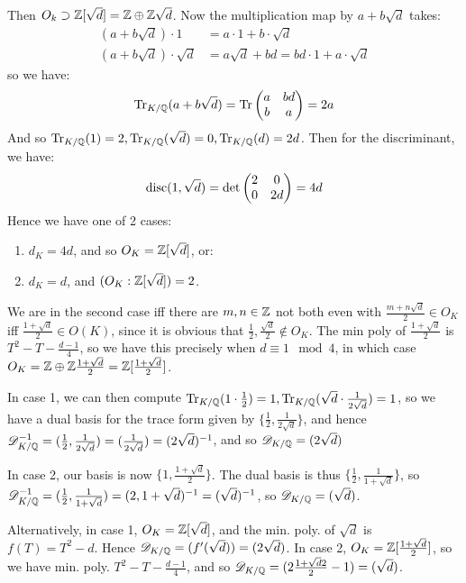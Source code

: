 \documentclass[10pt,a4paper]{article}
\begin{document}
Then $O_k \supset \mathbb{Z}[\sqrt{d}] = \mathbb{Z} \oplus \mathbb{Z}\sqrt{d}$. Now the multiplication map by $a+b\sqrt{d}$ takes:
\begin{align*}
  (a+b\sqrt{d})\cdot 1 &= a\cdot 1 + b\cdot \sqrt{d}\\
  (a+b\sqrt{d})\cdot \sqrt{d} &= a\sqrt{d} + bd = bd\cdot 1 + a\cdot \sqrt{d}
\end{align*}
so we have:
\[\operatorname{Tr}_{K/\mathbb{Q}}(a+b\sqrt{d}) = \operatorname{Tr}\begin{pmatrix} a & bd \\ b & a\end{pmatrix} = 2a\]
And so $\operatorname{Tr}_{K/\mathbb{Q}}(1) = 2, \operatorname{Tr}_{K/\mathbb{Q}}(\sqrt{d}) = 0, \operatorname{Tr}_{K/\mathbb{Q}}(d) = 2d$. Then for the discriminant, we have:
\[\operatorname{disc}(1, \sqrt{d}) = \det\begin{pmatrix} 2 & 0 \\ 0 & 2d\end{pmatrix} = 4d\]
Hence we have one of 2 cases:
\begin{enumerate}
  \item $d_K = 4d$, and so $O_K = \mathbb{Z}[\sqrt{d}]$, or:
  \item $d_K = d$, and $(O_K:\mathbb{Z}[\sqrt{d}]) = 2$.
\end{enumerate}
We are in the second case iff there are $m, n \in \mathbb{Z}$ not both even with $\frac{m+n\sqrt{d}}{2} \in O_K$ iff $\frac{1+\sqrt{d}}{2} \in O(K)$, since it is obvious that $\frac{1}{2}, \frac{\sqrt{d}}{2} \notin O_K$. The min poly of $\frac{1+\sqrt{d}}{2}$ is $T^2-T-\frac{d-1}{4}$, so we have this precisely when $d \equiv 1 \mod 4$, in which case $O_K = \mathbb{Z} \oplus \mathbb{Z} \frac{1+\sqrt{d}}{2} = \mathbb{Z}[\frac{1+\sqrt{d}}{2}]$.

In case 1, we can then compute $\operatorname{Tr}_{K/\mathbb{Q}}(1\cdot \frac{1}{2}) = 1, \operatorname{Tr}_{K/\mathbb{Q}}(\sqrt{d}\cdot\frac{1}{2\sqrt{d}}) = 1$, so we have a dual basis for the trace form given by $\{\frac12, \frac{1}{2\sqrt{d}}\}$, and hence $\mathscr{D}_{K/\mathbb{Q}}^{-1} = (\frac{1}{2}, \frac{1}{2\sqrt{d}}) = (\frac{1}{2\sqrt{d}}) = (2\sqrt{d})^{-1}$, and so $\mathscr{D}_{K/\mathbb{Q}} = (2\sqrt{d})$

In case 2, our basis is now $\{1, \frac{1+\sqrt{d}}{2}\}$. The dual basis is thus $\{\frac{1}{2}, \frac{1}{1+\sqrt{d}}\}$, so $\mathscr{D}_{K/\mathbb{Q}}^{-1} = (\frac{1}{2}, \frac{1}{1+\sqrt{d}}) = (2, 1+\sqrt{d})^{-1} = (\sqrt{d})^{-1}$, so $\mathscr{D}_{K/\mathbb{Q}} = (\sqrt{d})$.

Alternatively, in case 1, $O_K = \mathbb{Z}[\sqrt{d}]$, and the min. poly. of $\sqrt{d}$ is $f(T) = T^2-d$. Hence $\mathscr{D}_{K/\mathbb{Q}} = (f'(\sqrt{d})) = (2\sqrt{d})$. In case 2, $O_K = \mathbb{Z}[\frac{1+\sqrt{d}}{2}]$, so we have min. poly. $T^2-T-\frac{d-1}{4}$, and so $\mathscr{D}_{K/\mathbb{Q}} = (2\frac{1+\sqrt{d}{2}}{2}-1) = (\sqrt{d})$.
\end{document}
